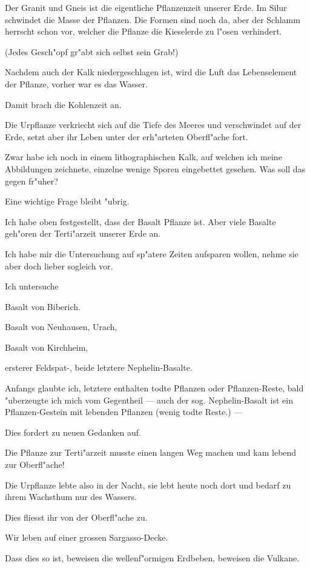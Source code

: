 \documentclass[a4paper, 11pt, oneside, german]{article}
\begin{document}
Der Granit und Gneis ist die eigentliche Pflanzenzeit unserer Erde. Im Silur schwindet die Masse der Pflanzen. Die Formen sind noch da, aber der Schlamm herrscht schon vor, welcher die Pflanze die Kieselerde zu l"osen verhindert.

(Jedes Gesch"opf gr"abt sich selbst sein Grab!)

Nachdem auch der Kalk niedergeschlagen ist, wird die Luft das Lebenselement der Pflanze, vorher war es das Wasser.

Damit brach die Kohlenzeit an.

Die Urpflanze verkriecht sich auf die Tiefe des Meeres und verschwindet auf der Erde, setzt aber ihr Leben unter der erh"arteten Oberfl"ache fort.

Zwar habe ich noch in einem lithographischen Kalk, auf welchen ich meine Abbildungen zeichnete, einzelne wenige Sporen eingebettet gesehen. Was soll das gegen fr"uher?

Eine wichtige Frage bleibt "ubrig.

Ich habe oben festgestellt, dass der Basalt Pflanze ist. Aber viele Basalte geh"oren der Terti"arzeit unserer Erde an.

Ich habe mir die Untersuchung auf sp"atere Zeiten aufsparen wollen, nehme sie aber doch lieber sogleich vor.

Ich untersuche

    Basalt von Biberich.

    Basalt von Neuhausen, Urach,

    Basalt von Kirchheim,

ersterer Feldspat-, beide letztere Nephelin-Basalte.

Anfangs glaubte ich, letztere enthalten todte Pflanzen oder Pflanzen-Reste, bald "uberzeugte ich mich vom Gegentheil --- auch der sog. Nephelin-Basalt ist ein Pflanzen-Gestein mit lebenden Pflanzen (wenig todte Reste.) ---

Dies fordert zu neuen Gedanken auf.

Die Pflanze zur Terti"arzeit musste einen langen Weg machen und kam lebend zur Oberfl"ache!

Die Urpflanze lebte also in der Nacht, sie lebt heute noch dort und bedarf zu ihrem Wachsthum nur des Wassers.

Dies fliesst ihr von der Oberfl"ache zu.

Wir leben auf einer grossen Sargasso-Decke.

Dass dies so ist, beweisen die wellenf"ormigen Erdbeben, beweisen die Vulkane.
\end{document}
